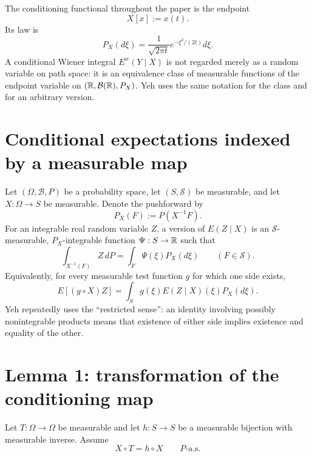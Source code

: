 The conditioning functional throughout the paper is the endpoint
\begin{equation}\label{eq:Yeh-endpoint}
 X[x]:=x(t).
\end{equation}
Its law is
\begin{equation}\label{eq:Yeh-endpoint-law}
 P_X(d\xi)
 =\frac1{\sqrt{2\pi t}}e^{-\xi^2/(2t)}d\xi.
\end{equation}
A conditional Wiener integral $E^w(Y\mid X)$ is not regarded merely as a random variable on path space: it is an equivalence class of measurable functions of the endpoint variable on $(\mathbb{R},\mathcal B(\mathbb{R}),P_X)$.  Yeh uses the same notation for the class and for an arbitrary version.

\section{Conditional expectations indexed by a measurable map}
Let $(\Omega,\mathcal B,P)$ be a probability space, let $(S,\mathcal S)$ be measurable, and let $X:\Omega\to S$ be measurable.  Denote the pushforward by
\[
 P_X(F):=P(X^{-1}F).
\]
For an integrable real random variable $Z$, a version of $E(Z\mid X)$ is an $\mathcal S$-measurable, $P_X$-integrable function $\Psi:S\to\mathbb{R}$ such that
\begin{equation}\label{eq:Yeh-definition}
 \int_{X^{-1}(F)}Z\,dP
 =\int_F\Psi(\xi)P_X(d\xi)
 \qquad(F\in\mathcal S).
\end{equation}
Equivalently, for every measurable test function $g$ for which one side exists,
\begin{equation}\label{eq:Yeh-test}
 E[(g\circ X)Z]
 =\int_Sg(\xi)E(Z\mid X)(\xi)P_X(d\xi).
\end{equation}
Yeh repeatedly uses the ``restricted sense'': an identity involving possibly nonintegrable products means that existence of either side implies existence and equality of the other.

\section{Lemma 1: transformation of the conditioning map}
Let $T:\Omega\to\Omega$ be measurable and let $h:S\to S$ be a measurable bijection with measurable inverse.  Assume
\begin{equation}\label{eq:Yeh-commutation}
 X\circ T=h\circ X
 \qquad P\text{-a.s.}
\end{equation}

